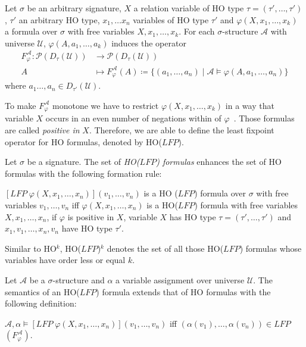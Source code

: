 \begin{definition}
\label{definition:induced_operator}
    Let $\sigma$ be an arbitrary signature, $X$ a relation variable of HO type $\tau = (\tau', \dots, \tau')$,
    $\tau'$ an arbitrary HO type, $x_1, \dots x_n$ variables of HO type $\tau'$ and $\varphi(X, x_1, \dots, x_k)$ a
    formula over $\sigma$ with free variables $X, x_1, \dots, x_k$. For each $\sigma$-structure $\mathcal{A}$ with
    universe $\mathcal{U}$, $\varphi(A, a_1, \dots, a_k)$ induces the operator
    \begin{align*}
        F_\varphi^\mathcal{A}\colon\mathscr{P}(D_\tau(\mathcal{U})) &\longrightarrow \mathscr{P}(D_\tau(\mathcal{U}))\\
        A &\longmapsto F_\varphi^\mathcal{A}(A) \coloneqq \{(a_1, \dots, a_n) \mid \mathcal{A} \models \varphi(A, a_1,
        \dots, a_n)\}
    \end{align*}
    where $a_1 \dots, a_n \in D_{\tau'}(\mathcal{U})$.
\end{definition}

To make $F_\varphi^\mathcal{A}$ monotone we have to restrict $\varphi(X, x_1, \dots, x_k)$ in a way that variable
$X$ occurs in an even number of negations within of $\varphi$~\cite{freireMartins2011descriptive}. Those formulas
are called \textit{positive in} $X$. Therefore, we are able to define the least fixpoint operator for HO
formulas, denoted by HO($\mathit{LFP}$).

\begin{definition}
    Let $\sigma$ be a signature. The set of \emph{HO($\mathit{LFP}$) formulas} enhances the set of HO formulas with the
    following formation rule:
    \begin{compactitem}
        \item $[\mathit{LFP}\;\varphi(X, x_1, \dots, x_n)](v_1, \dots, v_n)$ is a HO
        ($\mathit{LFP}$) formula over $\sigma$ with free variables $v_1, \dots, v_n$ iff $\varphi(X, x_1, \dots, x_n)
        $ is a HO($\mathit{LFP}$) formula with free variables $X, x_1, \dots, x_n$, if $\varphi$ is positive in
        $X$, variable $X$ has HO type $\tau = (\tau', \dots, \tau')$ and $x_1, v_1, \dots, x_n, v_n$ have HO type $\tau'$.
    \end{compactitem}
\end{definition}

Similar to HO$^k$, HO($\mathit{LFP}$)$^k$ denotes the set of all those HO($\mathit{LFP}$) formulas whose variables have
order less or equal $k$.

\begin{definition}
    Let $\mathcal{A}$ be a $\sigma$-structure and $\alpha$ a variable assignment over universe $\mathcal{U}$. The
    semantics of an HO($\mathit{LFP}$) formula extends that of HO formulas with the following definition:
    \begin{compactitem}
        \item $\mathcal{A}, \alpha \models [\mathit{LFP}\;\varphi(X, x_1, \dots, x_n)](v_1, \dots,
        v_n)$ iff $(\alpha(v_1), \dots, \alpha(v_n)) \in \mathit{LFP}$ $(F_\varphi^\mathcal{A})$.
    \end{compactitem}
\end{definition}

